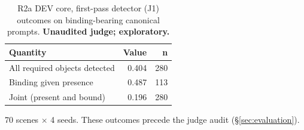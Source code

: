 \begin{table}[t]
\centering\small
\caption{R2a DEV core, first-pass detector (J1) outcomes on binding-bearing canonical prompts. \textbf{Unaudited judge; exploratory.}}
\label{tab:r2a-first-pass}
\begin{tabular}{lrr}
\toprule
Quantity & Value & n \\
\midrule
All required objects detected & 0.404 & 280 \\
Binding given presence & 0.487 & 113 \\
Joint (present and bound) & 0.196 & 280 \\
\bottomrule
\end{tabular}
\par\smallskip\footnotesize 70 scenes $\times$ 4 seeds. These outcomes precede the judge audit (\S\ref{sec:evaluation}).
\end{table}
